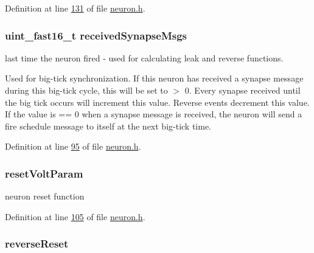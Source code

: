 Definition at line \hyperlink{neuron_8h_source_l00131}{131} of file \hyperlink{neuron_8h_source}{neuron.\+h}.

\hypertarget{structneuron_state_af8935bcba177f2f3dfb9119c39ef7dc5}{}
\subsubsection[{received\+Synapse\+Msgs}]{\setlength{\rightskip}{0pt plus 5cm}uint\+\_\+fast16\+\_\+t received\+Synapse\+Msgs}\label{structneuron_state_af8935bcba177f2f3dfb9119c39ef7dc5}


last time the neuron fired -\/ used for calculating leak and reverse functions. 

Used for big-\/tick synchronization. If this neuron has received a synapse message during this big-\/tick cycle, this will be set to $>$ 0. Every synapse received until the big tick occurs will increment this value. Reverse events decrement this value. If the value is == 0 when a synapse message is received, the neuron will send a fire schedule message to itself at the next big-\/tick time. 

Definition at line \hyperlink{neuron_8h_source_l00095}{95} of file \hyperlink{neuron_8h_source}{neuron.\+h}.

\hypertarget{structneuron_state_add87cc0b2bc3426f0fd870f7df6decd5}{}
\subsubsection[{reset\+Volt\+Param}]{ reset\+Volt\+Param}\label{structneuron_state_add87cc0b2bc3426f0fd870f7df6decd5}


neuron reset function 



Definition at line \hyperlink{neuron_8h_source_l00105}{105} of file \hyperlink{neuron_8h_source}{neuron.\+h}.

\hypertarget{structneuron_state_abf6970098695585c81e101b2a741b9a5}{}
\subsubsection[{reverse\+Reset}]{ reverse\+Reset}\label{structneuron_state_abf6970098695585c81e101b2a741b9a5}


